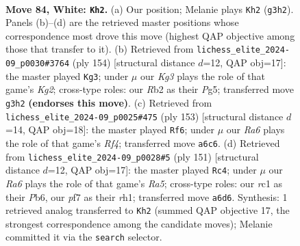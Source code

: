 \documentclass[11pt]{article}
\begin{document}
\clearpage

\begin{figure}[p]\centering
\begin{subfigure}{0.46\textwidth}\centering
\resizebox{\linewidth}{!}{%
\newchessgame
\chessboard[
  setfen={8/5pk1/R3p3/8/P3P3/5PK1/1R6/2r5 w - - 59 84},
  showmover=false,
  pgfstyle=straightmove, color=movearrow, markmove={g3-h2}
]}
\caption{}
\end{subfigure}\hfill
\begin{subfigure}{0.46\textwidth}\centering
\resizebox{\linewidth}{!}{%
\newchessgame
\chessboard[
  setfen={8/5R2/4p1p1/4k1P1/2r4P/8/5PK1/8 w - - 1 78},
  showmover=false,
  pgfstyle=straightmove, color=movearrow, markmove={g2-g3}
]}
\caption{}
\end{subfigure}
\\[4pt]
\begin{subfigure}{0.46\textwidth}\centering
\resizebox{\linewidth}{!}{%
\newchessgame
\chessboard[
  setfen={8/6k1/R7/5r1p/6p1/6P1/5P2/6K1 b - - 47 77},
  showmover=false,
  pgfstyle=straightmove, color=movearrow, markmove={f5-f6}
]}
\caption{}
\end{subfigure}\hfill
\begin{subfigure}{0.46\textwidth}\centering
\resizebox{\linewidth}{!}{%
\newchessgame
\chessboard[
  setfen={8/4k3/1p2p3/p3P1K1/r4P2/8/8/7R b - - 3 76},
  showmover=false,
  pgfstyle=straightmove, color=movearrow, markmove={a4-c4}
]}
\caption{}
\end{subfigure}
\caption{\textbf{Move 84, White: \texttt{Kh2}.} (a) Our position; Melanie plays \texttt{Kh2} (\texttt{g3h2}). Panels (b)--(d) are the retrieved master positions whose correspondence most drove this move (highest QAP objective among those that transfer to it). (b) Retrieved from \texttt{lichess\_elite\_2024-09\_p0030\#3764} (ply 154) [structural distance $d$=12, QAP obj=17]: the master played \texttt{Kg3}; under $\mu$ our \emph{Kg3} plays the role of that game's \emph{Kg2}; cross-type roles: our \emph{R}b2 as their \emph{P}g5; transferred move \texttt{g3h2} \textbf{(endorses this move)}. (c) Retrieved from \texttt{lichess\_elite\_2024-09\_p0025\#475} (ply 153) [structural distance $d$=14, QAP obj=18]: the master played \texttt{Rf6}; under $\mu$ our \emph{Ra6} plays the role of that game's \emph{Rf4}; transferred move \texttt{a6c6}. (d) Retrieved from \texttt{lichess\_elite\_2024-09\_p0028\#5} (ply 151) [structural distance $d$=12, QAP obj=17]: the master played \texttt{Rc4}; under $\mu$ our \emph{Ra6} plays the role of that game's \emph{Ra5}; cross-type roles: our \emph{r}c1 as their \emph{P}b6, our \emph{p}f7 as their \emph{r}h1; transferred move \texttt{a6d6}. Synthesis: 1 retrieved analog transferred to \texttt{Kh2} (summed QAP objective 17, the strongest correspondence among the candidate moves); Melanie committed it via the \texttt{search} selector.}
\label{fig:thought-m166}
\end{figure}
\end{document}
